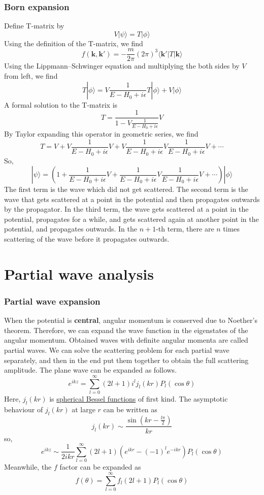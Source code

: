 \subsubsection{Born expansion}
\noindent
Define T-matrix by
\[V | \psi \rangle = T |\phi\rangle\]
Using the definition of the T-matrix, we find
\[f(\bm{k},\bm{k}') = - \frac{m}{2\pi} (2\pi)^3  \langle \bm{k}'| T | \bm{k}\rangle \]
Using the Lippmann–Schwinger equation and multiplying the
both sides by $V$ from left, we find
\[ T |\phi\rangle = V \frac{1}{E-H_0 + i\epsilon}T|\phi\rangle + V|\phi\rangle\]
A formal solution to the T-matrix is
\[T = \frac{1}{1-V\frac{1}{E-H_0 + i\epsilon}}V\]
By Taylor expanding this operator in geometric series, we find
\[T = V + V \frac{1}{E-H_0 + i\epsilon} V + V \frac{1}{E-H_0 + i\epsilon} V \frac{1}{E-H_0 + i\epsilon} V + \cdots\]
So,
\[|\psi\rangle = \left( 1 +  \frac{1}{E-H_0 + i\epsilon} V +  \frac{1}{E-H_0 + i\epsilon} V \frac{1}{E-H_0 + i\epsilon} V + \cdots \right) | \phi \rangle\]
The first term is the wave which did not get scattered.
The second term is the wave that gets scattered at a point in the potential and then propagates outwards by the propagator. 
In the third term, the wave gets scattered at a point in the potential, propagates for a while, and gets scattered again at another point in the potential, and propagates outwards. 
In the $n+1$-th term, there are $n$ times scattering of the wave before it propagates outwards.

\section{Partial wave analysis}
\subsubsection{Partial wave expansion}
When the potential is \textbf{central}, angular momentum is conserved due to Noether's theorem. Therefore, we can expand the wave function in the eigenstates of the angular momentum. Obtained waves with definite angular momenta are called partial waves. We can solve the scattering problem for each partial wave separately, and then in the end put them together to obtain the full scattering amplitude.
The plane wave can be expanded as follows.
\[e^{ikz} = \sum_{l=0}^{\infty}(2l+1)i^l j_l(kr) P_l(\cos \theta)\]
Here, $j_l(kr)$ is \href{https://en.wikipedia.org/wiki/Bessel_function#Spherical_Bessel_functions:_jn.2C_yn}{spherical Bessel functions} of first kind. The asymptotic behaviour of $j_l(kr)$ at large $r$ can be written as
\[j_l(kr) \sim \frac{\sin(kr-\frac{l\pi}{2})}{kr}\]
so,
\[e^{ikz} \sim \frac{1}{2ikr} \sum_{l=0}^{\infty} (2l+1) (e^{ikr} - (-1)^l e^{-ikr})P_l(\cos \theta)\]
Meanwhile, the $f$ factor can be expanded as
\[f(\theta) = \sum_{l=0}^{\infty} f_l (2l+1)P_l(\cos \theta)\]

